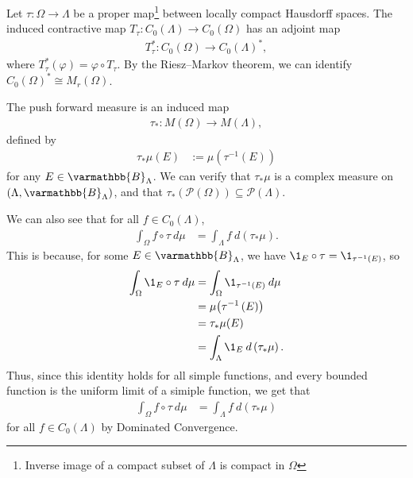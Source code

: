 \documentclass[10pt]{mypackage}
\renewcommand*{\mathbb}[1]{\varmathbb{#1}}
\newcommand{\B}{\mathbb{B}}
\begin{document}
\begin{example}
  Let $\tau: \Omega \rightarrow \Lambda$ be a proper map\footnote{Inverse image of a compact subset of $\Lambda$ is compact in $\Omega$} between locally compact Hausdorff spaces. The induced contractive map $T_{\tau}: C_0\left(\Lambda\right)\rightarrow C_0\left(\Omega\right)$ has an adjoint map
  \begin{align*}
    T_{\tau}^{\ast}: C_0\left(\Omega\right)\rightarrow C_0\left(\Lambda\right)^{\ast},
  \end{align*}
  where $T_{\tau}^{\ast}\left(\varphi\right) = \varphi\circ T_{\tau}$. By the Riesz--Markov theorem, we can identify $C_0\left(\Omega\right)^{\ast}\cong M_{r}\left(\Omega\right)$.\newline

  The push forward measure is an induced map
  \begin{align*}
    \tau_{\ast}: M(\Omega) \rightarrow M(\Lambda),
  \end{align*}
  defined by
  \begin{align*}
    \tau_{\ast}\mu\!\left(E\right) &:= \mu\!\left(\tau^{-1}\left(E\right)\right)
  \end{align*}
  for any $E\in \B_{\Lambda}$. We can verify that $\tau_{\ast}\mu$ is a complex measure on $\left(\Lambda,\B_{\Lambda}\right)$, and that $\tau_{\ast}\left(\mathcal{P}\left(\Omega\right)\right)\subseteq \mathcal{P}\left(\Lambda\right)$.\newline

  We can also see that for all $f\in C_0\left(\Lambda\right)$,
  \begin{align*}
    \int_{\Omega}f\circ \tau\:d\mu &= \int_{\Lambda}f\:d\left(\tau_{\ast}\mu\right).
  \end{align*}
  This is because, for some $E\in \B_{\Lambda}$, we have $\1_{E}\circ \tau = \1_{\tau^{-1}\left(E\right)}$, so
  \begin{align*}
    \int_{\Omega}\1_{E}\circ \tau\:d\mu &= \int_{\Omega}\1_{\tau^{-1}\left(E\right)}\:d\mu\\
                                        &= \mu\!\left(\tau^{-1}\left(E\right)\right)\\
                                        &= \tau_{\ast}\mu\!\left(E\right)\\
                                        &= \int_{\Lambda}\1_{E}\:d\left(\tau_{\ast}\mu\right).
  \end{align*}
  Thus, since this identity holds for all simple functions, and every bounded function is the uniform limit of a simiple function, we get that
  \begin{align*}
    \int_{\Omega}f\circ \tau\:d\mu &= \int_{\Lambda}f\:d\left(\tau_{\ast}\mu\right)
  \end{align*}
  for all $f\in C_0\left(\Lambda\right)$ by Dominated Convergence.\newline


\end{example}
\end{document}
